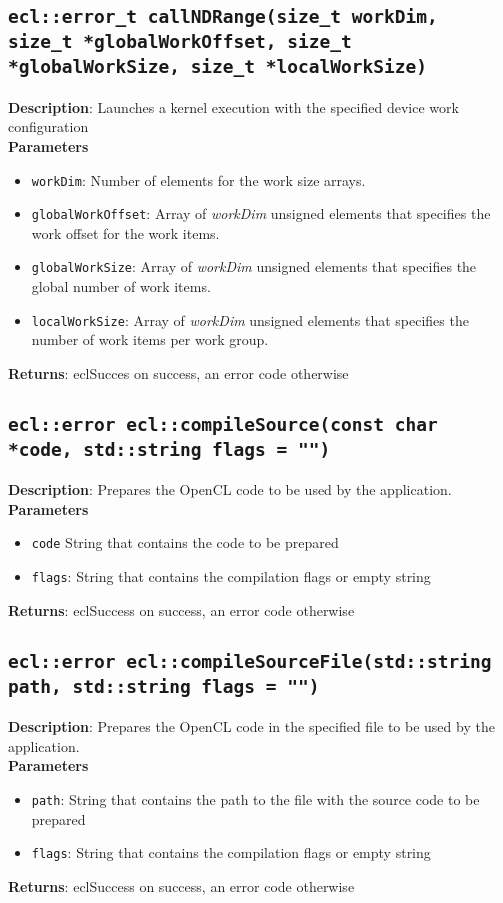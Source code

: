 \subsection{\texttt{ecl::error\_t callNDRange(size\_t workDim, size\_t *globalWorkOffset, size\_t 
*globalWorkSize, size\_t *localWorkSize)}}

\textbf{Description}: Launches a kernel execution with the specified device work configuration\\
\textbf{Parameters}
\begin{itemize}
  \item \texttt{workDim}: Number of elements for the work size arrays.
  \item \texttt{globalWorkOffset}: Array of \emph{workDim} unsigned elements that specifies the work 
  offset for the work items.
  \item \texttt{globalWorkSize}: Array of \emph{workDim} unsigned elements that specifies the global 
  number of work items.
  \item \texttt{localWorkSize}: Array of \emph{workDim} unsigned elements that specifies the number 
  of work items per work group.
\end{itemize}
\textbf{Returns}: eclSucces on success, an error code otherwise


\subsection{\texttt{ecl::error ecl::compileSource(const char *code, std::string flags = "")}}

\textbf{Description}: Prepares the OpenCL code to be used by the application. \\
\textbf{Parameters}
\begin{itemize}
  \item \texttt{code} String that contains the code to be prepared
  \item \texttt{flags}: String that contains the compilation flags or empty string
\end{itemize}
\textbf{Returns}: eclSuccess on success, an error code otherwise

\subsection{\texttt{ecl::error ecl::compileSourceFile(std::string path, std::string flags = "")}}

\textbf{Description}: Prepares the OpenCL code in the specified file to be used by the application.  \\
\textbf{Parameters}
\begin{itemize}
  \item \texttt{path}: String that contains the path to the file with the source code to be prepared
  \item \texttt{flags}: String that contains the compilation flags or empty string
\end{itemize}
\textbf{Returns}: eclSuccess on success, an error code otherwise

